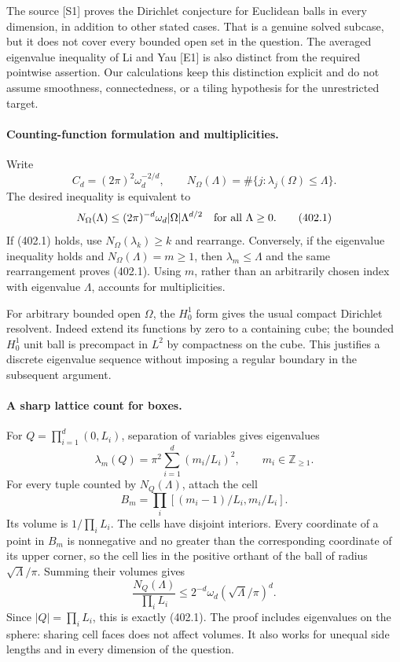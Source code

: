 \documentclass[11pt]{article}
\begin{document}
The source [S1] proves the Dirichlet conjecture for Euclidean balls in every dimension, in addition to other stated cases. That is a genuine solved subcase, but it does not cover every bounded open set in the question. The averaged eigenvalue inequality of Li and Yau [E1] is also distinct from the required pointwise assertion. Our calculations keep this distinction explicit and do not assume smoothness, connectedness, or a tiling hypothesis for the unrestricted target.

\paragraph{Counting-function formulation and multiplicities.}
Write
\[
 C_d=(2\pi)^2\omega_d^{-2/d},\qquad
 N_\Omega(\Lambda)=\#\{j:\lambda_j(\Omega)\le\Lambda\}.
\]
The desired inequality is equivalent to
\[
 N_\Omega(\Lambda)\le(2\pi)^{-d}\omega_d|\Omega|\Lambda^{d/2}
 \quad\hbox{for all }\Lambda\ge0. \tag{402.1}
\]
If (402.1) holds, use $N_\Omega(\lambda_k)\ge k$ and rearrange. Conversely, if the eigenvalue inequality holds and $N_\Omega(\Lambda)=m\ge1$, then $\lambda_m\le\Lambda$ and the same rearrangement proves (402.1). Using $m$, rather than an arbitrarily chosen index with eigenvalue $\Lambda$, accounts for multiplicities.

For arbitrary bounded open $\Omega$, the $H_0^1$ form gives the usual compact Dirichlet resolvent. Indeed extend its functions by zero to a containing cube; the bounded $H_0^1$ unit ball is precompact in $L^2$ by compactness on the cube. This justifies a discrete eigenvalue sequence without imposing a regular boundary in the subsequent argument.

\paragraph{A sharp lattice count for boxes.}
For $Q=\prod_{i=1}^d(0,L_i)$, separation of variables gives eigenvalues
\[
 \lambda_m(Q)=\pi^2\sum_{i=1}^d(m_i/L_i)^2,
 \qquad m_i\in\mathbb Z_{\ge1}.
 \tag{402.2}
\]
For every tuple counted by $N_Q(\Lambda)$, attach the cell
\[
 B_m=\prod_i[(m_i-1)/L_i,m_i/L_i].
\]
Its volume is $1/\prod_iL_i$. The cells have disjoint interiors. Every coordinate of a point in $B_m$ is nonnegative and no greater than the corresponding coordinate of its upper corner, so the cell lies in the positive orthant of the ball of radius $\sqrt\Lambda/\pi$. Summing their volumes gives
\[
 \frac{N_Q(\Lambda)}{\prod_iL_i}
 \le2^{-d}\omega_d(\sqrt\Lambda/\pi)^d.
 \tag{402.3}
\]
Since $|Q|=\prod_iL_i$, this is exactly (402.1). The proof includes eigenvalues on the sphere: sharing cell faces does not affect volumes. It also works for unequal side lengths and in every dimension of the question.
\end{document}
